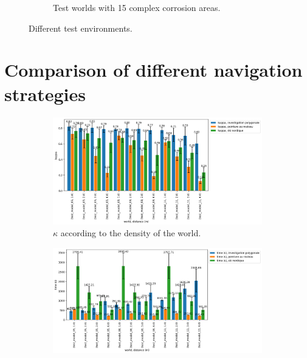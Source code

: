 \begin{theappendices}
\begin{figure}[H]
\begin{subfigure}[t]{0.15\linewidth}
				\caption{Test worlds with 15 complex corrosion areas.}
				\label{fig:test_model_15_complex_1}
			\end{subfigure}
			\caption{Different test environments.}
			\label{fig:test_models}
		\end{figure}

	\chapter{Comparison of different navigation strategies}\label{annexe:comparaison}

		\begin{figure}[H]
			\begin{subfigure}[t]{0.9\linewidth}
				\includegraphics[width=\linewidth]{graphics/investigation_polygonale-peinture_au_rouleau_ski_nordique-kappa_for_each_d_vs_investigation_polygonale-kappa_for_each_d.png}
				\caption{$\kappa$ according to the density of the world.}
				\label{fig:investigation_polygonale-peinture_au_rouleau_ski_nordique-kappa_for_each_d_vs_investigation_polygonale-kappa_for_each_d}
			\end{subfigure}
			\hfill
			\begin{subfigure}[t]{0.9\linewidth}
				\includegraphics[width=\linewidth]{graphics/investigation_polygonale-peinture_au_rouleau_ski_nordique-time_for_each_d_vs_investigation_polygonale-time_for_each_d.png}

\end{subfigure}
\end{figure}
\end{theappendices}
